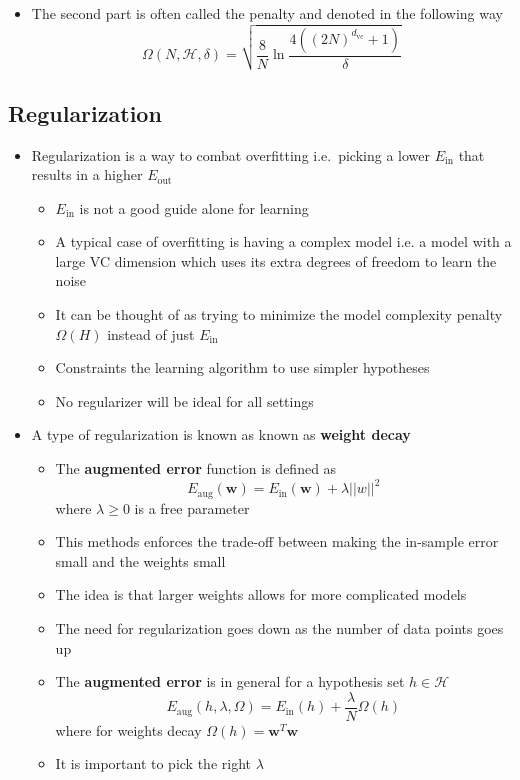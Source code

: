 \documentclass[a4, english]{article}
\begin{document}
\begin{itemize}
\begin{itemize}
    \item The second part is often called the penalty and denoted in the following way 
\begin{equation*}
  \Omega(N,\mathcal H, \delta) = \sqrt{\frac8N\ln\frac{4((2N)^{d_\text{vc}} + 1)}\delta}  
\end{equation*}
  \end{itemize}  
\end{itemize}

\subsection{Regularization}
\begin{itemize}
	\item Regularization is a way to combat overfitting i.e.~picking a lower $E_\text{in}$ that results in a higher $E_\text{out}$ 
  \begin{itemize}
  	\item $E_{\text{in}}$ is not a good guide alone for learning 
    \item A typical case of overfitting is having a complex model i.e. a model with a large VC dimension which uses its extra degrees of freedom to learn the noise 
    \item It can be thought of as trying to minimize the model complexity penalty $\Omega(H)$ instead of just $E_\text{in}$ 
    \item Constraints the learning algorithm to use simpler hypotheses
    \item No regularizer will be ideal for all settings
  \end{itemize}
  \item A type of regularization is known as known as \textbf{weight decay} 
  \begin{itemize}
  	\item The \textbf{augmented error} function is defined as 
    \begin{equation*}
      E_\text{aug}(\pmb w) = E_\text{in}(\pmb w) + \lambda ||w||^2
    \end{equation*}
    where $\lambda \geq 0$ is a free parameter
    \item This methods enforces the trade-off between making the in-sample error small and the weights small 
    \item The idea is that larger weights allows for more complicated models
    \item The need for regularization goes down as the number of data points goes up
    \item The \textbf{augmented error} is in general for a hypothesis set $h \in \mathcal H$
\begin{equation*}
    E_\text{aug}(h,\lambda,\Omega) = E_\text{in}(h) + \frac\lambda N \Omega(h)
\end{equation*}
    where for weights decay $\Omega(h) = \pmb w^T\pmb w$
    \item It is important to pick the right $\lambda$
  \end{itemize}

\end{itemize}
\end{document}
